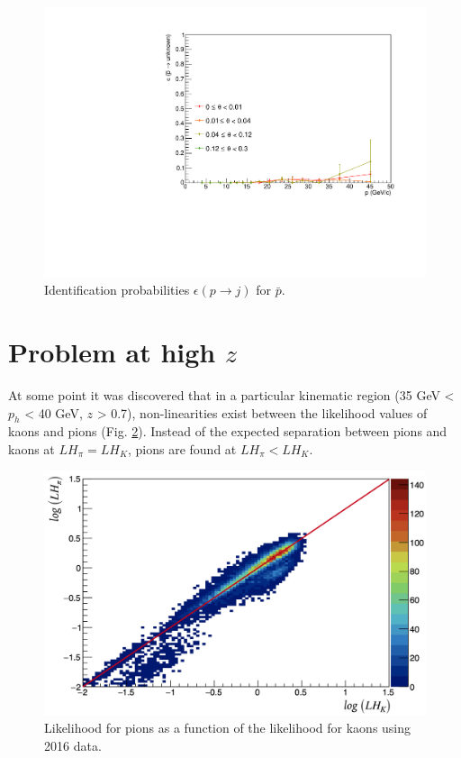 \begin{figure}[!p]
  \includegraphics[scale=0.38]{./gfx/pm_u.pdf}
	\caption{Identification probabilities $\epsilon(p \rightarrow j)$ for $\bar{p}$.}
	\label{pic:Effpim}
\end{figure}

\newpage

\section{Problem at high $z$}

At some point it was discovered that in a particular kinematic region (35 GeV < $p_h$ < 40 GeV, $z$ > 0.7), non-linearities exist between the likelihood values of kaons and pions (Fig. \ref{pic:NonLin}). Instead of the expected separation between pions and kaons at $LH_{\pi} = LH_K$, pions are found at $LH_{\pi} < LH_K$.

\begin{figure}[!h]
  \centering
	\includegraphics[scale=0.35]{./gfx/RICHLH.png}
	\caption{Likelihood for pions as a function of the likelihood for kaons using 2016 data.}
	\label{pic:NonLin}
\end{figure}

